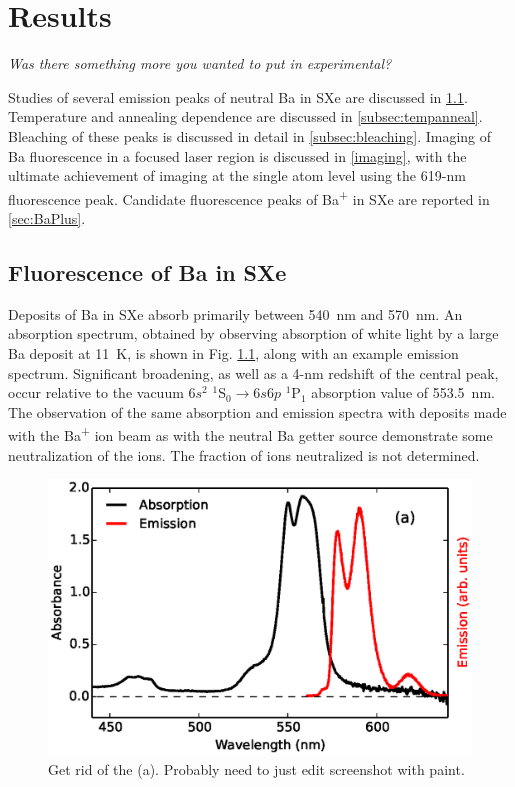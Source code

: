 \chapter{Results}

\emph{\color{gray}Was there something more you wanted to put in experimental?}

Studies of several emission peaks of neutral Ba in SXe are discussed in \ref{sec:fluorescence}.  Temperature and annealing dependence are discussed in \ref{subsec:tempanneal}.  Bleaching of these peaks is discussed in detail in \ref{subsec:bleaching}.  Imaging of Ba fluorescence in a focused laser region is discussed in \ref{imaging}, with the ultimate achievement of imaging at the single atom level using the 619-nm fluorescence peak.  Candidate fluorescence peaks of Ba\textsuperscript{+} in SXe are reported in \ref{sec:BaPlus}.

\section{Fluorescence of Ba in SXe}
\label{sec:fluorescence}

Deposits of Ba in SXe absorb primarily between 540~nm and 570~nm.  An absorption spectrum, obtained by observing absorption of white light by a large Ba deposit at 11~K, is shown in Fig. \ref{fig:BaAbs}, along with an example emission spectrum.  Significant broadening, as well as a 4-nm redshift  of the central peak, occur relative to the vacuum $6s^{2}$ $^{1}$S$_{0} \rightarrow 6s6p$ $^{1}$P$_{1}$ absorption value of 553.5~nm.  The observation of the same absorption and emission spectra with deposits made with the Ba\textsuperscript{+} ion beam as with the neutral Ba getter source demonstrate some neutralization of the ions.  The fraction of ions neutralized is not determined.  \cite{Mong2015,Shon,Brian}

\begin{figure} %
        \centering
                \includegraphics[width=.7\textwidth]{figures/BaAbs_fromBaSpec.eps}
                \caption{\color{red}Get rid of the (a).  Probably need to just edit screenshot with paint.  \cite{Mong2015}}
\label{fig:BaAbs}
\end{figure}

